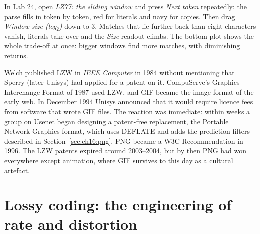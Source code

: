 
\begin{tryit}
In Lab 24, open \emph{LZ77: the sliding window} and press \emph{Next token} repeatedly: the
parse fills in token by token, red for literals and navy for copies. Then drag \emph{Window size
(log$_2$)} down to 3. Matches that lie further back than eight characters vanish, literals take
over and the \emph{Size} readout climbs. The bottom plot shows the whole trade-off at once: bigger
windows find more matches, with diminishing returns.
\end{tryit}

\begin{history}
Welch published LZW in \emph{IEEE Computer} in 1984 without mentioning that Sperry (later Unisys)
had applied for a patent on it. CompuServe's Graphics Interchange Format of 1987 used LZW, and GIF
became the image format of the early web. In December 1994 Unisys announced that it would require
licence fees from software that wrote GIF files. The reaction was immediate: within weeks a group
on Usenet began designing a patent-free replacement, the Portable Network Graphics format, which
uses DEFLATE and adds the prediction filters described in Section~\ref{sec:ch16:png}. PNG became
a W3C Recommendation in 1996. The LZW patents expired around 2003--2004, but by then PNG had won
everywhere except animation, where GIF survives to this day as a cultural artefact.
\end{history}



\section{Lossy coding: the engineering of rate and distortion}
\label{sec:ch16:lossy}

